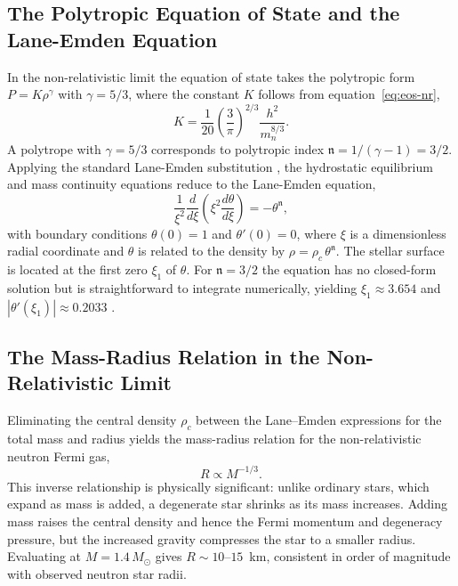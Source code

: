 \subsection{The Polytropic Equation of State and the Lane-Emden Equation}
 
In the non-relativistic limit the equation of state takes the polytropic
form $P = K\rho^\gamma$ with $\gamma = 5/3$, where the constant $K$
follows from equation~\eqref{eq:eos-nr},
%
\begin{equation}
    K = \frac{1}{20}\left(\frac{3}{\pi}\right)^{2/3}
        \frac{h^2}{m_n^{8/3}}.
    \label{eq:polytropic-K}
\end{equation}
%
A polytrope with $\gamma = 5/3$ corresponds to polytropic index
$\mathfrak{n} = 1/(\gamma - 1) = 3/2$. Applying the standard
Lane-Emden substitution \cite{Chandrasekhar1939}, the hydrostatic
equilibrium and mass continuity equations reduce to the Lane-Emden
equation,
%
\begin{equation}
    \frac{1}{\xi^2}\frac{d}{d\xi}
    \left(\xi^2 \frac{d\theta}{d\xi}\right)
    = -\theta^{\mathfrak{n}},
    \label{eq:lane-emden}
\end{equation}
%
with boundary conditions $\theta(0) = 1$ and $\theta'(0) = 0$, where
$\xi$ is a dimensionless radial coordinate and $\theta$ is related to
the density by $\rho = \rho_c\,\theta^{\mathfrak{n}}$. The stellar
surface is located at the first zero $\xi_1$ of $\theta$. For
$\mathfrak{n} = 3/2$ the equation has no closed-form solution but is
straightforward to integrate numerically, yielding $\xi_1 \approx 3.654$
and $|\theta'(\xi_1)| \approx 0.2033$ \cite{Chandrasekhar1939}.


\subsection{The Mass-Radius Relation in the Non-Relativistic Limit}
 
Eliminating the central density $\rho_c$ between the Lane--Emden
expressions for the total mass and radius yields the mass-radius
relation for the non-relativistic neutron Fermi gas,
%
\begin{equation}
    R \propto M^{-1/3}.
    \label{eq:mass-radius-nr}
\end{equation}
%
This inverse relationship is physically significant: unlike ordinary
stars, which expand as mass is added, a degenerate star shrinks
as its mass increases. Adding mass raises the central density and hence
the Fermi momentum and degeneracy pressure, but the increased gravity
compresses the star to a smaller radius. Evaluating at $M = 1.4\,M_\odot$
gives $R \sim 10$--$15$~km, consistent in order of magnitude with
observed neutron star radii.


